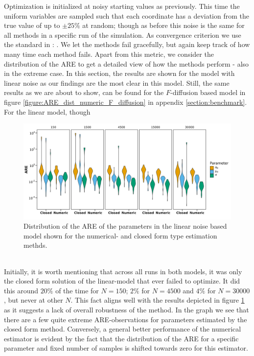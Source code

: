 Optimization is initialized at noisy starting values as previously. This time the uniform variables are sampled such that each coordinate has a deviation from the true value of up to $\pm 25\%$ at random; though as before this noise is the same for all methods in a specific run of the simulation. As convergence criterion we use the standard in : . We let the methods fail gracefully, but again keep track of how many time each method fails. Apart from this metric, we consider the distribution of the ARE to get a detailed view of how the methods perform - also in the extreme case. In this section, the results are shown for the model with linear noise as our findings are the most clear in this model. Still, the same results as we are about to show, can be found for the $F$-diffusion based model in figure \ref{figure:ARE_dist_numeric_F_diffusion} in appendix \ref{section:benchmark}. For the linear model, though
\begin{figure}[h!]
\begin{center}
    \includegraphics[scale = .1]{figures/ARE_dist_result_plot_Linear.jpeg}
    \caption{Distribution of the ARE of the parameters in the linear noise based model shown for the numerical- and closed form type estimation methds.}
    \label{figure:ARE_dist_linear_noise}
\end{center}
\end{figure}\\
Initially, it is worth mentioning that across all runs in both models, it was only the closed form solution of the linear-model that ever failed to optimize. It did this around $20\%$ of the time for $N = 150$; $2\%$ for $N = 4500$ and $4\%$ for $N = 30000$, but never at other $N$. This fact aligns well with the results depicted in figure \ref{figure:ARE_dist_linear_noise} as it suggests a lack of overall robustness of the method. In the graph we see that there are a few quite extreme ARE-observations for parameters estimated by the closed form method. Conversely, a general better performance of the numerical estimator is evident by the fact that the distribution of the ARE for a specific parameter and fixed number of samples is shifted towards zero for this estimator. 


